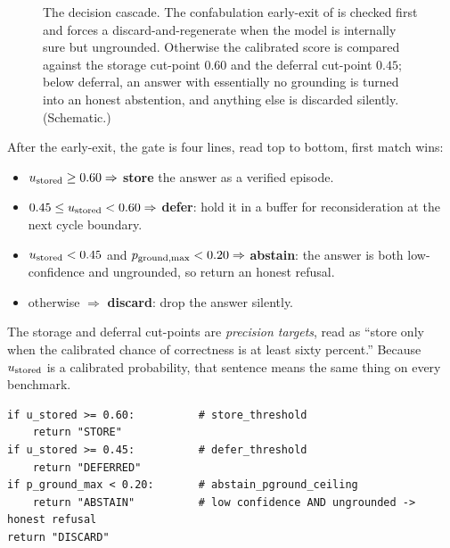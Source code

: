 \begin{figure}[htbp]
\caption[The four-outcome gate]{The decision cascade. The confabulation early-exit of
 is checked first and forces a discard-and-regenerate when the model
is internally sure but ungrounded. Otherwise the calibrated score is compared against
the storage cut-point $0.60$ and the deferral cut-point $0.45$; below deferral, an
answer with essentially no grounding is turned into an honest abstention, and anything
else is discarded silently. (Schematic.)}
\label{fig:gate}
\end{figure}

\begin{precise}
After the early-exit, the gate is four lines, read top to bottom, first match wins:
\begin{itemize}[leftmargin=1.4em, itemsep=1pt]
  \item $u_{\text{stored}} \ge 0.60 \Rightarrow$ \textbf{store} the answer as a verified episode.
  \item $0.45 \le u_{\text{stored}} < 0.60 \Rightarrow$ \textbf{defer}: hold it in a buffer for
  reconsideration at the next cycle boundary.
  \item $u_{\text{stored}} < 0.45$ and $p_{\text{ground,max}} < 0.20 \Rightarrow$ \textbf{abstain}: the answer
  is both low-confidence and ungrounded, so return an honest refusal.
  \item otherwise $\Rightarrow$ \textbf{discard}: drop the answer silently.
\end{itemize}
The storage and deferral cut-points are \emph{precision targets}, read as ``store only
when the calibrated chance of correctness is at least sixty percent.'' Because
$u_{\text{stored}}$ is a calibrated probability, that sentence means the same thing on every
benchmark.
\end{precise}

\begin{lstlisting}[caption={The gate, condensed from \texttt{caem/verification/verifier.py}.}, label={lst:gate}]
if u_stored >= 0.60:          # store_threshold
    return "STORE"
if u_stored >= 0.45:          # defer_threshold
    return "DEFERRED"
if p_ground_max < 0.20:       # abstain_pground_ceiling
    return "ABSTAIN"          # low confidence AND ungrounded -> honest refusal
return "DISCARD"
\end{lstlisting}

